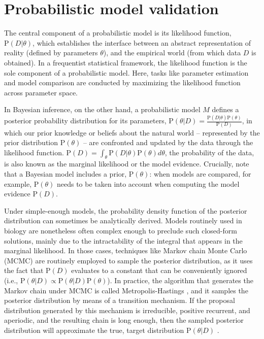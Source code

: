 \documentclass[oneside]{article}
\begin{document}
\section*{Probabilistic model validation}

The central component of a probabilistic model is its likelihood
function, $\text{P}(D|\theta)$, which establishes the
interface between an abstract representation of reality (defined by
parameters $\theta$), and the empirical world (from which data $D$ is
obtained).
In a frequentist statistical framework, the likelihood function is the sole
component of a probabilistic model.
Here, tasks like parameter estimation and model comparison are conducted
by maximizing the likelihood function across parameter
space.

In Bayesian inference, on the other hand, a probabilistic model $M$
defines a posterior probability distribution for its parameters,
$\text{P}(\theta|D) = \frac{\text{P}(D|\theta)\text{P}(\theta)}{\text{P}(D)}$, in which our prior
knowledge or beliefs about the natural world -- represented by the prior
distribution $\text{P}(\theta)$ -- are confronted and updated by the data through the
likelihood function.
$\text{P}(D) = \int_\theta \text{P}(D|\theta)\text{P}(\theta)d\theta$, the probability of
the data, is also known as the marginal likelihood or the model
evidence.
Crucially, note that a Bayesian model includes a prior, $\text{P}(\theta)$:
when models are compared, for example, $\text{P}(\theta)$ needs to be taken
into account when computing the model evidence $\text{P}(D)$.

Under simple-enough models, the probability density function of the
posterior distribution can sometimes be analytically derived.
Models routinely used in biology are nonetheless often complex enough
to preclude such closed-form solutions, mainly due to the
intractability of the integral that appears in the marginal
likelihood.
In those cases, techniques like Markov chain Monte Carlo (MCMC) are
routinely employed to sample the posterior distribution, as it uses
the fact that $\text{P}(D)$ evaluates to a constant that can be
conveniently ignored (i.e., $\text{P}(\theta|D) \propto
\text{P}(\theta|D)\text{P}(\theta)$).
In practice, the algorithm that generates the Markov chain under MCMC is called
Metropolis-Hastings \citep{mh}, and it samples the posterior distribution by
means of a transition mechanism. 
If the proposal distribution generated by this mechanism is
irreducible, positive recurrent, and aperiodic, and the resulting
chain is long enough, then the sampled posterior distribution will approximate the true, target
distribution $\text{P}(\theta|D)$ \citep{smith93,tierney94,gelman}.
\end{document}
